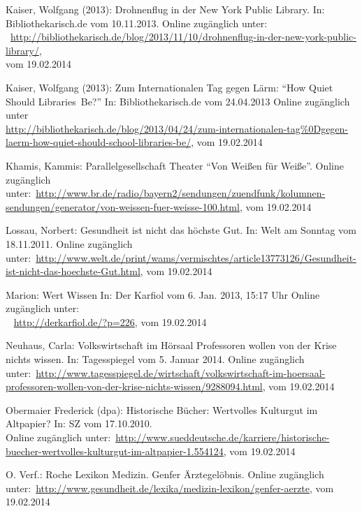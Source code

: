 \documentclass[a4paper,
fontsize=11pt,
oneside,
numbers=noperiodatend,
parskip=half-,
bibliography=totoc,
final
]{scrartcl}
\begin{document}
Kaiser, Wolfgang (2013): Drohnenflug in der New York Public Library. In:
Bibliothekarisch.de vom 10.11.2013. Online zugänglich
unter:
\\
~\url{http://bibliothekarisch.de/blog/2013/11/10/drohnenflug-in-der-new-york-public-library/}, \\
vom 19.02.2014

Kaiser, Wolfgang (2013): Zum Internationalen Tag gegen Lärm:
\enquote{How Quiet Should Libraries~Be?} In: Bibliothekarisch.de vom
24.04.2013 Online zugänglich unter~ \\
\href{http://bibliothekarisch.de/blog/2013/04/24/zum-internationalen-tag\%0Dgegen-laerm-how-quiet-should-school-libraries-be/}{http://bibliothekarisch.de/blog/2013/04/24/zum-internationalen-tag\%0Dgegen-laerm-how-quiet-should-school-libraries-be/}, 
vom 19.02.2014

Khamis, Kammis: Parallelgesellschaft Theater \enquote{Von Weißen für
Weiße}. Online zugänglich
unter:~\url{http://www.br.de/radio/bayern2/sendungen/zuendfunk/kolumnen-sendungen/generator/von-weissen-fuer-weisse-100.html},
vom 19.02.2014~

Lossau, Norbert: Gesundheit ist nicht das höchste Gut. In: Welt am
Sonntag vom 18.11.2011. Online zugänglich \\
unter:~\url{http://www.welt.de/print/wams/vermischtes/article13773126/Gesundheit-ist-nicht-das-hoechste-Gut.html},
vom 19.02.2014

Marion: Wert Wissen In: Der Karfiol vom 6. Jan. 2013, 15:17 Uhr Online
zugänglich unter:\\~ \url{http://derkarfiol.de/?p=226}, vom 19.02.2014~

Neuhaus, Carla: Volkswirtschaft im Hörsaal Professoren wollen von der
Krise nichts wissen. In: Tagesspiegel vom 5. Januar 2014. Online
zugänglich\\
unter:~\url{http://www.tagesspiegel.de/wirtschaft/volkswirtschaft-im-hoersaal-professoren-wollen-von-der-krise-nichts-wissen/9288094.html},
vom 19.02.2014

Obermaier Frederick (dpa): Historische Bücher: Wertvolles Kulturgut im
Altpapier? In: SZ vom 17.10.2010. \\ Online zugänglich
unter:~\url{http://www.sueddeutsche.de/karriere/historische-buecher-wertvolles-kulturgut-im-altpapier-1.554124},
vom 19.02.2014

O. Verf.: Roche Lexikon Medizin. Genfer Ärztegelöbnis. Online zugänglich
unter:~\url{http://www.gesundheit.de/lexika/medizin-lexikon/genfer-aerzte},
vom 19.02.2014~
\end{document}
